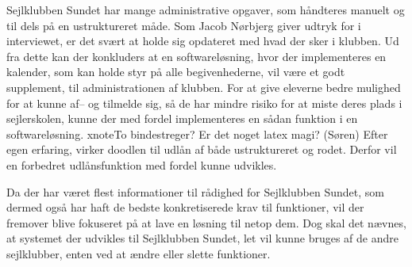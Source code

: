 Sejlklubben Sundet har mange administrative opgaver, som håndteres manuelt og til dels på en ustruktureret måde. 
Som Jacob Nørbjerg giver udtryk for i interviewet, er det svært at holde sig opdateret med hvad der sker i klubben. Ud fra dette kan der konkluders at en softwareløsning, hvor der implementeres en kalender, som kan holde styr på alle begivenhederne, vil være et godt supplement, til administrationen af klubben. 
For at give eleverne bedre mulighed for at kunne af-- og tilmelde sig, så de har mindre risiko for at miste deres plads i sejlerskolen, kunne der med fordel implementeres en sådan funktion i en softwareløsning. xnote{To bindestreger? Er det noget latex magi? (Søren)}
Efter egen erfaring, virker doodlen til udlån af både ustruktureret og rodet. 
Derfor vil en forbedret udlånsfunktion med fordel kunne udvikles.

Da der har været flest informationer til rådighed for Sejlklubben Sundet, som dermed også har haft de bedste
konkretiserede krav til funktioner, vil der fremover blive fokuseret på at lave en løsning til netop dem. 
Dog skal det nævnes, at systemet der udvikles til Sejlklubben Sundet, let vil kunne bruges af de andre sejlklubber, enten ved at ændre eller slette funktioner. 
